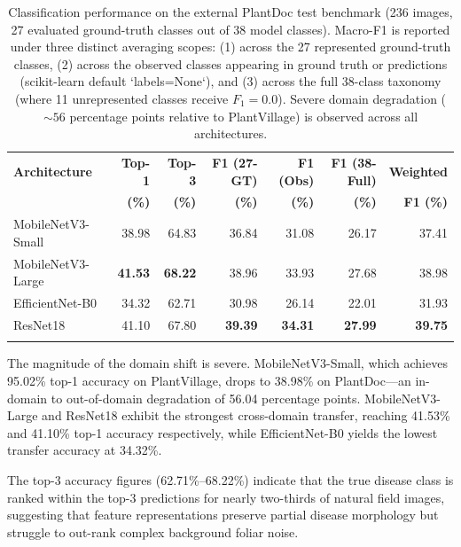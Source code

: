 \documentclass[pdflatex,sn-mathphys-num]{sn-jnl}
\theoremstyle{thmstyleone}%
\theoremstyle{thmstyletwo}%
\theoremstyle{thmstylethree}%
\begin{document}
\begin{table}[htbp]
\caption{Classification performance on the external PlantDoc test benchmark (236 images, 27 evaluated ground-truth classes out of 38 model classes). Macro-F1 is reported under three distinct averaging scopes: (1) across the 27 represented ground-truth classes, (2) across the observed classes appearing in ground truth or predictions (scikit-learn default `labels=None`), and (3) across the full 38-class taxonomy (where 11 unrepresented classes receive $F_1 = 0.0$). Severe domain degradation ($\sim 56$ percentage points relative to PlantVillage) is observed across all architectures.}\label{tab:plantdoc_results}%
\footnotesize
\setlength{\tabcolsep}{2pt}%
\begin{tabular*}{\textwidth}{@{\extracolsep\fill}lrrrrrr}
\toprule
\textbf{Architecture} & \textbf{Top-1} & \textbf{Top-3} & \textbf{F1 (27-GT)} & \textbf{F1 (Obs)} & \textbf{F1 (38-Full)} & \textbf{Weighted} \\
& \textbf{(\%)} & \textbf{(\%)} & \textbf{(\%)} & \textbf{(\%)} & \textbf{(\%)} & \textbf{F1 (\%)} \\
\midrule
MobileNetV3-Small & 38.98 & 64.83 & 36.84 & 31.08 & 26.17 & 37.41 \\
MobileNetV3-Large & \textbf{41.53} & \textbf{68.22} & 38.96 & 33.93 & 27.68 & 38.98 \\
EfficientNet-B0   & 34.32 & 62.71 & 30.98 & 26.14 & 22.01 & 31.93 \\
ResNet18          & 41.10 & 67.80 & \textbf{39.39} & \textbf{34.31} & \textbf{27.99} & \textbf{39.75} \\
\botrule
\end{tabular*}
\end{table}

The magnitude of the domain shift is severe. MobileNetV3-Small, which achieves 95.02\% top-1 accuracy on PlantVillage, drops to 38.98\% on PlantDoc---an in-domain to out-of-domain degradation of 56.04 percentage points. MobileNetV3-Large and ResNet18 exhibit the strongest cross-domain transfer, reaching 41.53\% and 41.10\% top-1 accuracy respectively, while EfficientNet-B0 yields the lowest transfer accuracy at 34.32\%.

The top-3 accuracy figures (62.71\%--68.22\%) indicate that the true disease class is ranked within the top-3 predictions for nearly two-thirds of natural field images, suggesting that feature representations preserve partial disease morphology but struggle to out-rank complex background foliar noise.
\end{document}
